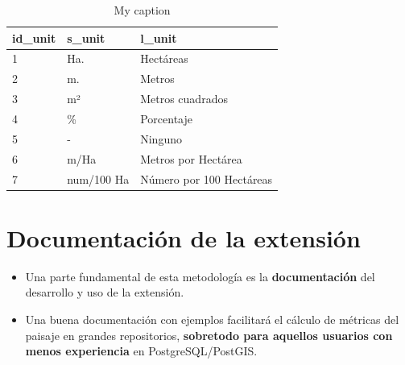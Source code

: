 \begin{table}[]
\centering
\caption{My caption}
\label{my-label}
\begin{tabular}{@{}lll@{}}
\toprule
\textbf{id\_unit} & \textbf{s\_unit} & \textbf{l\_unit}         \\ \midrule
1                 & Ha.              & Hectáreas                \\
2                 & m.               & Metros                   \\
3                 & m²               & Metros cuadrados         \\
4                 & \%               & Porcentaje               \\
5                 & -                & Ninguno                  \\
6                 & m/Ha             & Metros por Hectárea      \\
7                 & num/100 Ha       & Número por 100 Hectáreas \\ \bottomrule
\end{tabular}
\end{table}














\section{Documentación de la extensión}

\begin{graybox}
\begin{itemize}
\item Una parte fundamental de esta metodología es la \textbf{documentación} del desarrollo y uso de la extensión. 
\item Una buena documentación con ejemplos facilitará el cálculo de métricas del paisaje en grandes repositorios, \textbf{sobretodo para aquellos usuarios con menos experiencia} en PostgreSQL/PostGIS.
\end{itemize}
\end{graybox}

